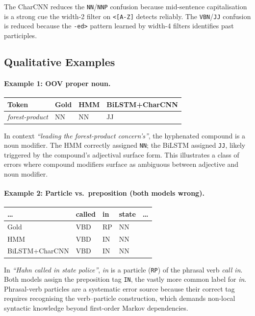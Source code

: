 \documentclass[11pt]{article}
\begin{document}
The CharCNN reduces the \texttt{NN}/\texttt{NNP} confusion because
mid-sentence capitalisation is a strong cue the width-2 filter on
\texttt{<[A-Z]} detects reliably.  The \texttt{VBN}/\texttt{JJ} confusion
is reduced because the \texttt{-ed>} pattern learned by width-4 filters
identifies past participles.

\subsection{Qualitative Examples}

\paragraph{Example 1: OOV proper noun.}
\begin{center}
\small
\begin{tabular}{llll}
\toprule
Token & Gold & HMM & BiLSTM+CharCNN \\
\midrule
\textit{forest-product} & NN & NN & JJ \\
\bottomrule
\end{tabular}
\end{center}
In context \textit{``leading the forest-product concern's''}, the hyphenated
compound is a noun modifier.  The HMM correctly assigned \texttt{NN}; the
BiLSTM assigned \texttt{JJ}, likely triggered by the compound's adjectival
surface form.  This illustrates a class of errors where compound modifiers
surface as ambiguous between adjective and noun modifier.

\paragraph{Example 2: Particle vs.\ preposition (both models wrong).}
\begin{center}
\small
\begin{tabular}{lllll}
\toprule
\ldots & called & in & state & \ldots \\
\midrule
Gold           & VBD & RP & NN & \\
HMM            & VBD & IN & NN & \\
BiLSTM+CharCNN & VBD & IN & NN & \\
\bottomrule
\end{tabular}
\end{center}
In \textit{``Hahn called in state police''}, \textit{in} is a particle
(\texttt{RP}) of the phrasal verb \textit{call in}.  Both models assign the
preposition tag \texttt{IN}, the vastly more common label for \textit{in}.
Phrasal-verb particles are a systematic error source because their correct
tag requires recognising the verb--particle construction, which demands
non-local syntactic knowledge beyond first-order Markov dependencies.
\end{document}
